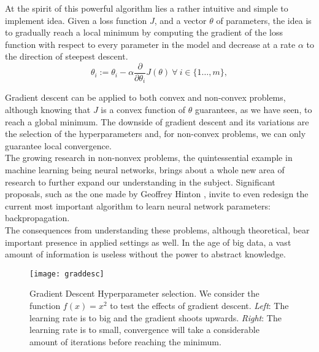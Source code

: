 \documentclass{article}
\begin{document}
	At the spirit of this powerful algorithm lies a rather intuitive and simple to implement idea. Given a loss function $J$, and a vector $\theta$ of parameters, the idea is to gradually reach a local minimum by computing the gradient of the loss function with respect to every parameter in the model and decrease at a rate $\alpha$ to the direction of steepest descent.  
	\begin{equation}
		\theta_i :=\theta_i - \alpha \frac{\partial}{\partial \theta_i} J(\theta) \ \forall \ i \in \{1 \ldots, m\},
	\end{equation}
	
	Gradient descent can be applied to both convex and non-convex problems, although knowing that $J$ is a convex function of $\theta$ guarantees, as we have seen, to reach a global minimum. The downside of gradient descent and its variations are the selection of the hyperparameters and, for non-convex problems, we can only guarantee local convergence.\\
	
	The growing research in non-nonvex problems, the quintessential example in machine learning being neural networks, brings about a whole new area of research to further expand our understanding in the subject. Significant proposals, such as the one made by Geoffrey Hinton \cite{levine}, invite to even redesign the current most important algorithm to learn neural network parameters: backpropagation. \\
	
	The consequences from understanding these problems, although theoretical, bear important presence in applied settings as well. In the age of big data, a vast amount of information is useless without the power to abstract knowledge.
	
	
	\begin{figure}
		\centering
		\texttt{[image: graddesc]}
		\caption{Gradient Descent Hyperparameter selection. We consider the function $f(x) = x^2$ to test the effects of gradient descent. \textit{Left}: The learning rate is to big and the gradient shoots upwards. \textit{Right}: The learning rate is to small, convergence will take a considerable amount of iterations before reaching the minimum.}
		\label{fig:graddesc}
	\end{figure}
	
\nocite{*}

\end{document}
